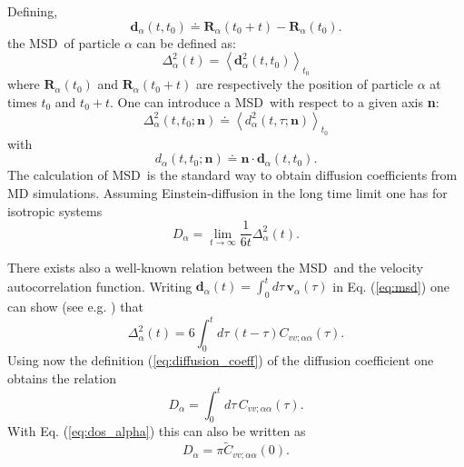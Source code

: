 \documentclass[a4paper,11pt]{article}
\begin{document}
Defining,
\begin{equation}
\textbf{d}_{\alpha}(t,t_0) \doteq \textbf{R}_\alpha(t_0 + t) - \textbf{R}_\alpha(t_0).
\end{equation}
the \gls{MSD}\ of particle $\alpha$ can be defined as:
\begin{equation}
\label{eq:msd}
\Delta^2_\alpha(t) = \left\langle \textbf{d}^2_\alpha(t,t_0) \right\rangle_{t_0}
\end{equation}
where $\textbf{R}_\alpha(t_0)$ and $\textbf{R}_\alpha(t_0 + t)$ are respectively the position of particle $\alpha$ at
times $t_0$ and $t_0+t$.
One can introduce a \gls{MSD}\ with respect to a given axis \textbf{n}:
\begin{equation}
\label{eq:msd_n}
\Delta^2_\alpha(t,t_0;\textbf{n}) \doteq \left\langle
d^2_\alpha(t,\tau;\textbf{n})\right\rangle_{t_0}
\end{equation}
with
\begin{equation}
d_{\alpha}(t,t_0;\textbf{n}) \doteq \textbf{n}\cdot \textbf{d}_{\alpha}(t,t_0).
\end{equation}
The calculation of \gls{MSD}\ is the standard way
to obtain diffusion coefficients from \gls{MD} simulations. Assuming
Einstein-diffusion in the long time limit one has for isotropic
systems
\begin{equation}
\label{eq:diffusion_coeff}
D_\alpha = \lim_{t\to\infty} \frac{1}{6t} \Delta^2_\alpha(t).
\end{equation}

There exists also a well-known relation between the \gls{MSD}\ and the velocity
autocorrelation function. Writing $\textbf{d}_\alpha(t) = \int_{0}^{t}d\tau\,\textbf{v}_\alpha(\tau)$  in Eq.
(\ref{eq:msd}) one can show (see e.g. \cite{Yip:1980}) that
\begin{equation}
\label{eq:msd_vacf}
\Delta^2_\alpha(t) = 6 \int_{0}^{t}d\tau\,(t - \tau)
C_{vv ; \alpha\alpha}(\tau).
\end{equation}
Using now the definition (\ref{eq:diffusion_coeff}) of the diffusion coefficient one
obtains the relation
\begin{equation}
\label{eq:d_vacf}
D_\alpha = \int_{0}^{t}d\tau\, C_{vv ; \alpha\alpha}(\tau).
\end{equation}
With Eq. (\ref{eq:dos_alpha}) this can  also be written as
\begin{equation}
\label{eq:d_dos}
D_\alpha = \pi \tilde C_{vv ; \alpha\alpha}(0).
\end{equation}
\end{document}
